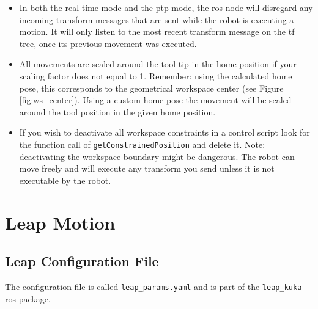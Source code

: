 \documentclass[headsepline,footinclude=false,fontsize=11pt,paper=a4,listof=totoc,bibliography=totoc,BCOR=12mm,DIV=14]{scrbook}
\begin{document}
\begin{itemize}
	\item In both the real-time mode and the \gls{ptp} mode, the \gls{ros} node will disregard any incoming transform messages that are sent while the robot is executing a motion. It will only listen to the most recent transform message on the tf tree, once its previous movement was executed.
	\item All movements are scaled around the tool tip in the home position if your scaling factor does not equal to 1. Remember: using the calculated home pose, this corresponds to the geometrical workspace center (see Figure \ref{fig:ws_center}). Using a custom home pose the movement will be scaled around the tool position in the given home position.
	\item If you wish to deactivate all workspace constraints in a control script look for the function call of \texttt{getConstrainedPosition} and delete it. Note: deactivating the workspace boundary might be dangerous. The robot can move freely and will execute any transform you send unless it is not executable by the robot.
	\end{itemize}

\section{Leap Motion}

\subsection{Leap Configuration File}

The configuration file is called \texttt{leap\_params.yaml} and is part of the \texttt{leap\_kuka} \gls{ros} package.
\end{document}
